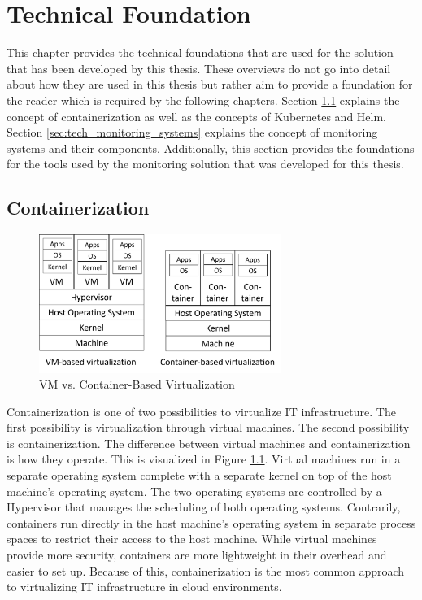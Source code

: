 \chapter{Technical Foundation}
\label{cha:technical_foundation}

This chapter provides the technical foundations that are used for the solution that has been developed by this thesis.
These overviews do not go into detail about how they are used in this thesis but rather aim to provide
a foundation for the reader which is required by the following chapters.
Section \ref{sec:tech_containerization} explains the concept of containerization as well as the concepts of Kubernetes and Helm.
Section \ref{sec:tech_monitoring_systems} explains the concept of monitoring systems and their components.
Additionally, this section provides the foundations for the tools used by the monitoring solution that was developed for this thesis.

\section{Containerization}
\label{sec:tech_containerization}

\begin{figure}[tb]
	\centering
	\includegraphics[width=0.7\textwidth]{figures/5.1_vm_container_virtualization.png}
	\caption{VM vs. Container-Based Virtualization \cite{CM-W-CON}}
	\label{fig:vm_container_virtualization}
\end{figure}

Containerization is one of two possibilities to virtualize IT infrastructure.
The first possibility is virtualization through virtual machines.
The second possibility is containerization. The difference between virtual machines
and containerization is how they operate. This is visualized in Figure \ref{fig:vm_container_virtualization}.
Virtual machines run in a separate operating system complete with a separate kernel on top of the host machine's
operating system. The two operating systems are controlled by a Hypervisor that manages the scheduling of both
operating systems. Contrarily, containers run directly in the host machine's operating system
in separate process spaces to restrict their access to the host machine.
While virtual machines provide more security, containers are more lightweight in their overhead
and easier to set up. Because of this, containerization is the most common approach to virtualizing
IT infrastructure in cloud environments.

